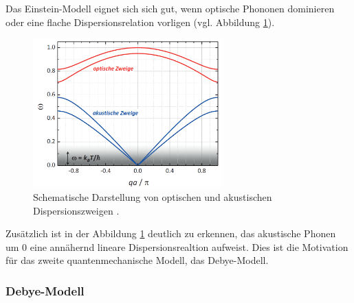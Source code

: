 Das Einstein-Modell eignet sich sich gut, wenn optische Phononen dominieren oder eine
flache Dispersionsrelation vorligen (vgl. Abbildung \ref{fig: dispersions_relation}).
\begin{figure}
  \centering
  \includegraphics[width = 0.65\textwidth]{./content/images/optische_akustische.PNG}
  \caption{Schematische Darstellung von optischen und akustischen Dispersionszweigen \cite[S. 223]{marx}.}
  \label{fig: dispersions_relation}
\end{figure}
Zusätzlich ist in der Abbildung \ref{fig: dispersions_relation} deutlich zu erkennen,
das akustische Phonen um $0$ eine annähernd lineare Dispersionsrealtion aufweist.
Dies ist die Motivation für das zweite quantenmechanische Modell, das
Debye-Modell.

\subsubsection{Debye-Modell}
